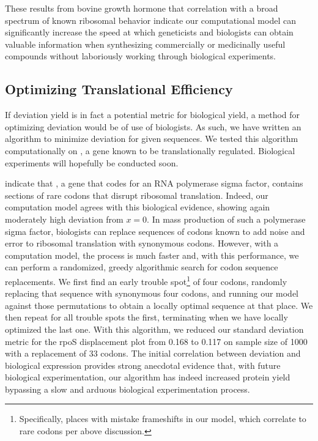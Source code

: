 \documentclass[12pt, draft]{article}
\numberwithin{equation}{section}
\begin{document}
These results from bovine growth hormone that correlation with a broad
spectrum of known ribosomal behavior indicate our computational model
can significantly increase the speed at which geneticists and
biologists can obtain valuable information when synthesizing
commercially or medicinally useful compounds without laboriously
working through biological experiments.

\subsection{Optimizing Translational Efficiency}

If deviation yield is in fact a potential metric for biological yield,
a method for optimizing deviation would be of use of biologists.  As such,
we have written an algorithm to minimize deviation for given sequences.
We tested this algorithm computationally on \rpoS, a gene known to
be translationally regulated.  Biological experiments will hopefully be
conducted soon.


\citet{rpos:process} indicate that \rpoS, a gene that codes for an RNA
polymerase sigma factor, contains sections of rare codons that disrupt
ribosomal translation. Indeed, our computation model agrees with this
biological evidence, showing again moderately high deviation from $x =
0$. In mass production of such a polymerase sigma factor, biologists
can replace sequences of codons known to add noise and error to
ribosomal translation with synonymous codons. 
However, with a computation model, the process is much
faster and, with this performance, we can perform a randomized, greedy
algorithmic search for codon sequence replacements. We first find an
early trouble spot\footnote{Specifically, places with
  mistake frameshifts in our model, which correlate to rare codons per
  above discussion.} of four codons, randomly replacing that sequence
with synonymous four codons, and running our model against those
permutations to obtain a locally optimal sequence at that place. We
then repeat for all trouble spots the first, terminating when we have locally
optimized the last one. With this algorithm, we reduced our standard
deviation metric for the rpoS displacement plot from 0.168 to 0.117
on sample size of 1000 with a replacement of 33 codons. The
initial correlation between deviation and biological expression
provides strong anecdotal evidence that, with future biological
experimentation, our algorithm has indeed increased protein yield
bypassing a slow and arduous biological experimentation process.
\end{document}
